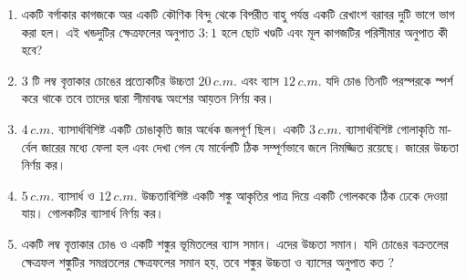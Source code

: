 \documentclass[11pt, a4paper]{article}
\begin{document}
\begin{enumerate}

	\item \textbengali{একটি বর্গাকার কাগজকে অর একটি কৌণিক বিন্দু থেকে বিপরীত বাহু পর্যন্ত একটি রেখাংশ বরাবর দুটি ভাগে ভাগ করা হল। এই খন্ডদুটির ক্ষেত্রফলের অনুপাত} $3:1$ \textbengali{হলে ছোট খণ্ডটি এবং মূল কাগজটির পরিসীমার অনুপাত কী হবে?}
	
	\item $3$ \textbengali{টি লম্ব বৃত্তাকার চোঙের প্রত্যেকটির উচ্চতা} $20\,c.m.$ \textbengali{এবং ব্যাস} $12\,c.m.$ \textbengali{যদি চোঙ তিনটি পরস্পরকে স্পর্শ করে থাকে তবে তাদের দ্বারা সীমাবদ্ধ অংশের আয়তন নির্ণয় কর।}

	\item $4\,c.m.$ \textbengali{ব্যাসার্ধবিশিষ্ট একটি চোঙাকৃতি জার অর্ধেক জলপূর্ণ ছিল। একটি} $3\,c.m.$ \textbengali{ব্যাসার্ধবিশিষ্ট গোলাকৃতি মার্বেল জারের মধ্যে ফেলা হল এবং দেখা গেল যে মার্বেলটি ঠিক সম্পূর্ণভাবে জলে নিমজ্জিত রয়েছে। জারের উচ্চতা নির্ণয় কর।}
	
	\item $5\,c.m.$ \textbengali{ব্যাসার্ধ ও} $12\,c.m.$ \textbengali{উচ্চতাবিশিষ্ট একটি শঙ্কু আকৃতির পাত্র দিয়ে একটি গোলককে ঠিক ঢেকে দেওয়া যায়। গোলকটির ব্যাসার্ধ নির্ণয় কর।}
	
	\item \textbengali{একটি লম্ব বৃত্তাকার চোঙ ও একটি শঙ্কুর ভূমিতলের ব্যাস সমান। এদের উচ্চতা সমান। যদি চোঙের বক্রতলের ক্ষেত্রফল শঙ্কুটির সমগ্রতলের ক্ষেত্রফলের সমান হয়, তবে শঙ্কুর উচ্চতা ও ব্যাসের অনুপাত কত ?}

\end{enumerate}
\end{document}
